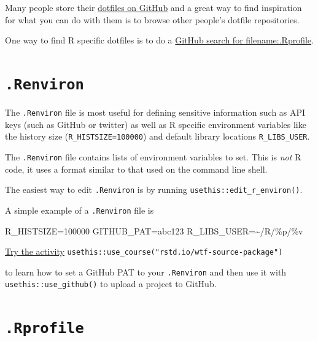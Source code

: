 \documentclass[
  letterpaper,
]{book}
\newenvironment{Shaded}{\begin{snugshade}}{\end{snugshade}}
\newcommand{\NormalTok}[1]{\textcolor[rgb]{0.00,0.23,0.31}{#1}}
\begin{document}
Many people store their \href{https://dotfiles.github.io/}{dotfiles on
GitHub} and a great way to find inspiration for what you can do with
them is to browse other people's dotfile repositories.

One way to find R specific dotfiles is to do a
\href{https://github.com/search?q=filename\%3A.Rprofile+interactive\&type=Code}{GitHub
search for filename:.Rprofile}.

\hypertarget{renviron}{%
\section{\texorpdfstring{\texttt{.Renviron}}{.Renviron}}\label{renviron}}

The \texttt{.Renviron} file is most useful for defining sensitive
information such as API keys (such as GitHub or twitter) as well as R
specific environment variables like the history size
(\texttt{R\_HISTSIZE=100000}) and default library locations
\texttt{R\_LIBS\_USER}.

The \texttt{.Renviron} file contains lists of environment variables to
set. This is \emph{not} R code, it uses a format similar to that used on
the command line shell.

The easiest way to edit \texttt{.Renviron} is by running
\texttt{usethis::edit\_r\_environ()}.

A simple example of a \texttt{.Renviron} file is

\begin{Shaded}
\begin{Highlighting}[]
\NormalTok{R\_HISTSIZE=100000}
\NormalTok{GITHUB\_PAT=abc123}
\NormalTok{R\_LIBS\_USER=\textasciitilde{}/R/\%p/\%v}
\end{Highlighting}
\end{Shaded}

\begin{rmdinfo}
\href{https://raw.githubusercontent.com/rstats-wtf/wtf-startup/master/01_startup_spartan.R}{Try
the activity}
\texttt{usethis::use\_course("rstd.io/wtf-source-package")}

to learn how to set a GitHub PAT to your \texttt{.Renviron} and then use
it with \texttt{usethis::use\_github()} to upload a project to GitHub.
\end{rmdinfo}

\hypertarget{rprofile}{%
\section{\texorpdfstring{\texttt{.Rprofile}}{.Rprofile}}\label{rprofile}}
\end{document}
